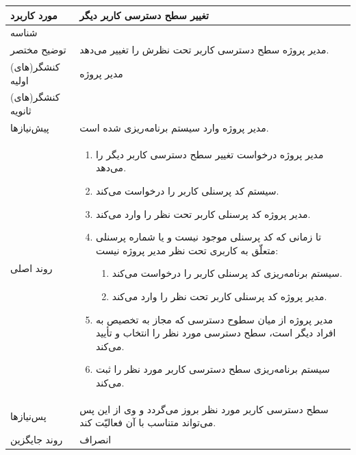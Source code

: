 \begin{table}[H]
	\centering
	\begin{tabular}{|p{3cm}|p{10cm}|}
		\hline
		مورد کاربرد & تغییر سطح دسترسی کاربر دیگر  \\
		\hline
		شناسه & 
		\stepcounter{usecase_ID}
		\arabic{usecase_ID} \\
		\hline
		توضیح مختصر & مدیر پروژه سطح دسترسی کاربر تحت نظرش را تغییر می‌دهد. \\
		\hline
		کنشگر(های) اولیه & مدیر پروژه \\
		\hline
		کنشگر(های) ثانویه &  \\
		\hline
		پیش‌نیازها & مدیر پروژه وارد سیستم برنامه‌ریزی شده است. \\
		\hline
		
		روند اصلی &
		\begin{enumerate}[topsep=0cm,leftmargin=0.5cm]
			\item مدیر پروژه درخواست تغییر سطح دسترسی کاربر دیگر را می‌دهد.
			\item سیستم کد پرسنلی کاربر را درخواست می‌کند.
			\item مدیر پروژه کد پرسنلی کاربر تحت نظر را وارد می‌کند. 
			\item تا زمانی که کد پرسنلی موجود نیست و یا شماره پرسنلی متعلّق به کاربری تحت نظر مدیر پروژه نیست:
			\begin{enumerate}[topsep=0cm,leftmargin=0.5cm]
				\item سیستم برنامه‌ریزی کد پرسنلی کاربر را درخواست می‌کند.
				\item مدیر پروژه کد پرسنلی کاربر تحت نظر را وارد می‌کند.
			\end{enumerate}
			\item مدیر پروژه از میان سطوح دسترسی که مجاز به تخصیص به افراد دیگر است، سطح دسترسی مورد نظر را انتخاب و تأیید می‌کند.
			\item سیستم برنامه‌ریزی سطح دسترسی کاربر مورد نظر را ثبت می‌کند.
		\end{enumerate} \\
		
		\hline
		پس‌نیازها & سطح دسترسی کاربر مورد نظر بروز می‌گردد و وی از این پس می‌تواند متناسب با آن فعالیّت کند. \\
		\hline
		روند جایگزین & انصراف \\
		\hline
	\end{tabular}
\end{table}



